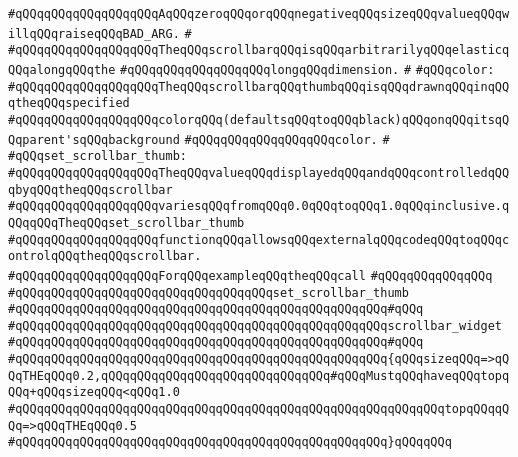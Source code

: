 \verb|#qQQqqQQqqQQqqQQqqQQqAqQQqzeroqQQqorqQQqnegativeqQQqsizeqQQqvalueqQQqwillqQQqraiseqQQqBAD_ARG.|\newline
\verb|#|\newline
\verb|#qQQqqQQqqQQqqQQqqQQqTheqQQqscrollbarqQQqisqQQqarbitrarilyqQQqelasticqQQqalongqQQqthe|\newline
\verb|#qQQqqQQqqQQqqQQqqQQqlongqQQqdimension.|\newline
\verb|#|\newline
\verb|#qQQqcolor:|\newline
\verb|#qQQqqQQqqQQqqQQqqQQqTheqQQqscrollbarqQQqthumbqQQqisqQQqdrawnqQQqinqQQqtheqQQqspecified|\newline
\verb|#qQQqqQQqqQQqqQQqqQQqcolorqQQq(defaultsqQQqtoqQQqblack)qQQqonqQQqitsqQQqparent'sqQQqbackground|\newline
\verb|#qQQqqQQqqQQqqQQqqQQqcolor.|\newline
\verb|#|\newline
\verb|#qQQqset_scrollbar_thumb:|\newline
\verb|#qQQqqQQqqQQqqQQqqQQqTheqQQqvalueqQQqdisplayedqQQqandqQQqcontrolledqQQqbyqQQqtheqQQqscrollbar|\newline
\verb|#qQQqqQQqqQQqqQQqqQQqvariesqQQqfromqQQq0.0qQQqtoqQQq1.0qQQqinclusive.qQQqqQQqTheqQQqset_scrollbar_thumb|\newline
\verb|#qQQqqQQqqQQqqQQqqQQqfunctionqQQqallowsqQQqexternalqQQqcodeqQQqtoqQQqcontrolqQQqtheqQQqscrollbar.|\newline
\verb|#qQQqqQQqqQQqqQQqqQQqForqQQqexampleqQQqtheqQQqcall|\newline
\verb|#qQQqqQQqqQQqqQQq|\newline
\verb|#qQQqqQQqqQQqqQQqqQQqqQQqqQQqqQQqqQQqset_scrollbar_thumb|\newline
\verb|#qQQqqQQqqQQqqQQqqQQqqQQqqQQqqQQqqQQqqQQqqQQqqQQqqQQq#qQQq|\newline
\verb|#qQQqqQQqqQQqqQQqqQQqqQQqqQQqqQQqqQQqqQQqqQQqqQQqqQQqscrollbar_widget|\newline
\verb|#qQQqqQQqqQQqqQQqqQQqqQQqqQQqqQQqqQQqqQQqqQQqqQQqqQQq#qQQq|\newline
\verb|#qQQqqQQqqQQqqQQqqQQqqQQqqQQqqQQqqQQqqQQqqQQqqQQqqQQq{qQQqsizeqQQq=>qQQqTHEqQQq0.2,qQQqqQQqqQQqqQQqqQQqqQQqqQQqqQQq#qQQqMustqQQqhaveqQQqtopqQQq+qQQqsizeqQQq<qQQq1.0|\newline
\verb|#qQQqqQQqqQQqqQQqqQQqqQQqqQQqqQQqqQQqqQQqqQQqqQQqqQQqqQQqqQQqtopqQQqqQQq=>qQQqTHEqQQq0.5|\newline
\verb|#qQQqqQQqqQQqqQQqqQQqqQQqqQQqqQQqqQQqqQQqqQQqqQQqqQQq}qQQqqQQq|\newline
